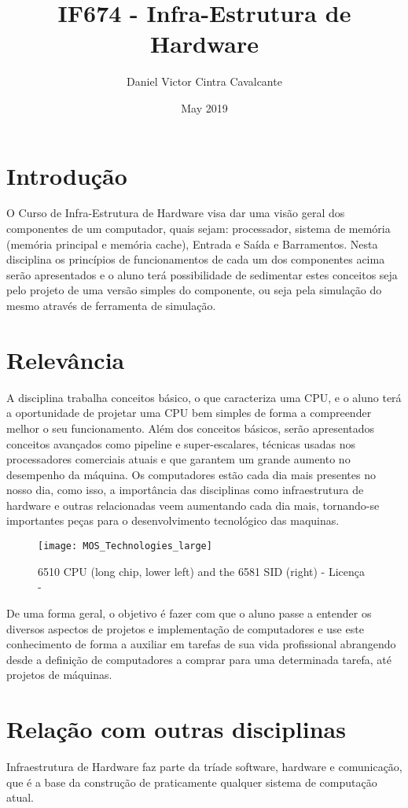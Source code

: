 \documentclass[10pt,a4paper]{article}
\title{IF674 - Infra-Estrutura de Hardware}
\author{Daniel Victor Cintra Cavalcante}
\date{May 2019}
\begin{document}
\maketitle

\section{Introdução}
O Curso de Infra-Estrutura de Hardware  visa dar uma visão geral dos componentes de um computador, quais sejam: processador, sistema de memória (memória principal e memória cache), Entrada e Saída e Barramentos.  Nesta disciplina os princípios de funcionamentos de cada um dos componentes acima serão apresentados e o aluno terá possibilidade de sedimentar estes conceitos seja pelo projeto de uma versão simples do componente, ou seja pela simulação do mesmo através de ferramenta de simulação.

\section{Relevância}
A disciplina trabalha conceitos básico, o que caracteriza uma CPU, e o aluno terá a oportunidade de projetar uma CPU bem simples de forma a compreender melhor o seu funcionamento. Além dos conceitos básicos, serão apresentados conceitos avançados como pipeline e super-escalares, técnicas usadas nos processadores comerciais atuais e que garantem um grande aumento no desempenho da máquina. Os computadores estão cada dia mais presentes no nosso dia, como isso, a importância das disciplinas como infraestrutura de hardware e outras relacionadas veem aumentando cada dia mais, tornando-se importantes peças para o desenvolvimento tecnológico das maquinas.
\begin{figure}[h!]
    \centering
    \texttt{[image: MOS\_Technologies\_large]}
    \caption{6510 CPU (long chip, lower left) and the 6581 SID (right) - Licença - \cite{img}}
    \end{figure}
 \newline
De uma forma geral, o objetivo é fazer com que o aluno passe a entender os diversos aspectos de projetos e implementação de computadores e use este conhecimento de forma a auxiliar em tarefas de sua vida profissional abrangendo desde a definição de computadores a comprar para uma determinada tarefa, até projetos de máquinas. 

\newpage

\section{Relação com outras disciplinas}
Infraestrutura de Hardware faz parte da tríade software, hardware e comunicação, que é a base da construção de praticamente qualquer sistema de computação atual.
\end{document}
